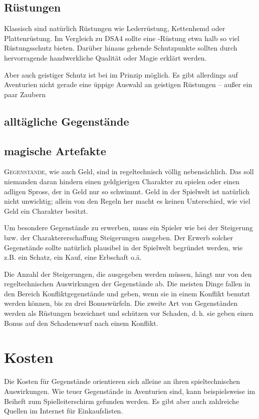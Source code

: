 \subsection{Rüstungen}
Klassisch sind natürlich Rüstungen wie Lederrüstung, Kettenhemd oder Plattenrüstung. Im Vergleich zu DSA4 sollte eine \StoryDSA-Rüstung etwa halb so viel Rüstungsschutz bieten. Darüber hinaus gehende Schutzpunkte sollten durch hervorragende handwerkliche Qualität oder Magie erklärt werden.

Aber auch geistiger Schutz ist bei \StoryDSA im Prinzip möglich. Es gibt allerdings auf Aventurien nicht gerade eine üppige Auswahl an geistigen Rüstungen -- außer ein paar Zaubern

\subsection{alltägliche Gegenstände}

\subsection{magische Artefakte}

\EN
\lettrine[lraise=0.35]{G}{egenstände}, wie auch Geld, sind in \StoryDSA regeltechnisch völlig nebensächlich. Das soll niemanden daran hindern einen geldgierigen Charakter zu spielen oder einen adligen Spross, der in Geld nur so schwimmt. Geld in der Spielwelt ist natürlich nicht unwichtig; allein von den Regeln her macht es keinen Unterschied, wie viel Geld ein Charakter besitzt.

Um besondere Gegenstände zu erwerben, muss ein Spieler wie bei der Steigerung bzw. der Charaktererschaffung Steigerungen ausgeben. Der Erwerb solcher Gegenstände sollte natürlich plausibel in der Spielwelt begründet werden, wie z.B. ein Schatz, ein Kauf, eine Erbschaft o.ä.

Die Anzahl der Steigerungen, die ausgegeben werden müssen, hängt nur von den regeltechnischen Auswirkungen der Gegenstände ab. Die meisten Dinge fallen in den Bereich Konfliktgegenstände und geben, wenn sie in einem Konflikt benutzt werden können, bis zu drei Bonuswürfeln. Die zweite Art von Gegenständen werden als Rüstungen bezeichnet und schützen vor Schaden, d.\,h. sie geben einen Bonus auf den Schadenswurf nach einem Konflikt.

\section{Kosten}
Die Kosten für Gegenstände orientieren sich alleine an ihren spieltechnischen Auswirkungen. Wie teuer Gegenstände in Aventurien sind, kann beispielsweise im Beiheft zum Spielleiterschirm gefunden werden. Es gibt aber auch zahlreiche Quellen im Internet für Einkaufslisten.

